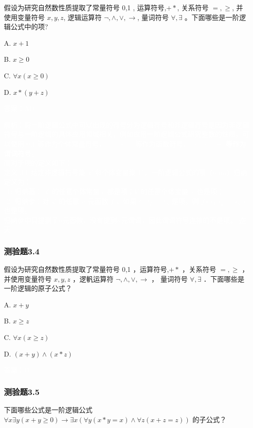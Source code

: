 \documentclass[UTF8, heading=true]{ctexart}
\begin{document}
假设为研究自然数性质提取了常量符号 0,1 , 运算符号,$+ *$,
 关系符号 $=, \geq$, 并使用变量符号 $x, y, z$, 
 逻辑运算符 $\neg, \wedge, \vee, \rightarrow$, 量词符号 $\forall, \exists$ 。下面哪些是一阶逻辑公式中的项?

A. $ x+1$

B. $ x \geq 0$

C. $\forall x(x \geq 0)$

D. $ x *(y+z)$

\textcolor{white}{答案：AD}

\textcolor{white}{解析：将一阶逻辑公式中可以出现的符号分为逻辑符号和非逻辑符号是因为非逻辑符号与一阶逻辑的具体应用领域相关，例如应用一阶逻辑公式研究整数的性质，可以使用 0,1 等作为个体常量符号，$+- \times, \div$ 等作为函数符号，\textbf{$\geq, \leq,=$ 等作为谓词符号}。\\ 而对于项的定义如下：\\ \indent 定义 3.1 给定非逻辑符号集 $\mathcal{L}$ 和个体变量集 $V$ ，一阶逻辑公式的项（term）归纳定义为：
\\ \indent (1) 归纳基： $\mathcal{L}$ 的任意个体常量 $c$ 都是项；$V$ 的任意个体变量 $x$ 也是项；
\\ \indent (2) 归纳步：对 $\mathcal{L}$ 的任意 $n$ 元函数 $f$ ，如果 $t_1, t_2, \cdots, t_n$ 是项，则 $f\left(t_1, t_2, \cdots, t_n\right)$ 也是项。
\\ \indent 归纳步中只提到了$n$元函数，没有提到$n$元谓词，因此谓词符号连接的不是项。 逆天\dots}

\subsubsection{测验题3.4}

假设为研究自然数性质提取了常量符号 0,1 ，运算符号,$+ *$ ，关系符号 $=, \geq$ ，
并使用变量符号 $x, y, z$ ，逻軓运算符 $\neg, \wedge, \vee, \rightarrow$ ，
量词符号 $\forall, \exists$ ．下面哪些是一阶逻辑的原子公式？

A. $ x+y$

B. $ x \geq z$

C. $\forall x(x \geq z)$

D.  $(x+y) \wedge(x * z)$

\textcolor{white}{答案：B}

\subsubsection{测验题3.5}

下面哪些公式是一阶逻辑公式 $\forall x \exists y(x+y \geq 0) \rightarrow \exists x(\forall y(x * y=x) \wedge \forall z(x+z=z))$ 的子公式？
\end{document}
